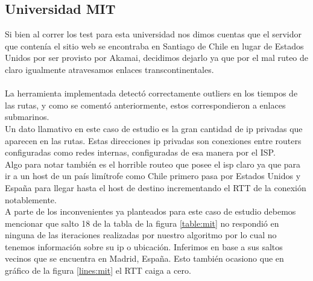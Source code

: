 \subsection{Universidad MIT}
Si bien al correr los test para esta universidad nos dimos cuentas que el servidor que contenía el sitio web se encontraba en Santiago de Chile en lugar de Estados Unidos por ser provisto por Akamai, decidimos dejarlo ya que por el mal ruteo de claro igualmente atravesamos enlaces transcontinentales.\\\\
La herramienta implementada detectó correctamente outliers en los tiempos de las rutas, y como se comentó anteriormente, estos correspondieron a enlaces submarinos.\\ 
Un dato llamativo en este caso de estudio es la gran cantidad de ip privadas que aparecen en las rutas. Estas direcciones ip privadas son conexiones entre routers configuradas como redes internas, configuradas de esa manera por el ISP.\\
Algo para notar también es el horrible routeo que posee el isp claro ya que para ir a un host de un país limítrofe como Chile primero pasa por Estados Unidos y España para llegar hasta el host de destino incrementando el RTT de la conexión notablemente.\\
A parte de los inconvenientes ya planteados para este caso de estudio debemos mencionar que salto 18 de la tabla de la figura \ref{table:mit} no respondió en ninguna de las iteraciones realizadas por nuestro algoritmo por lo cual no tenemos información sobre su ip o ubicación. Inferimos en base a sus saltos vecinos que se encuentra en Madrid, España. Esto también ocasiono que en gráfico de la figura \ref{lines:mit} el RTT caiga a cero.

